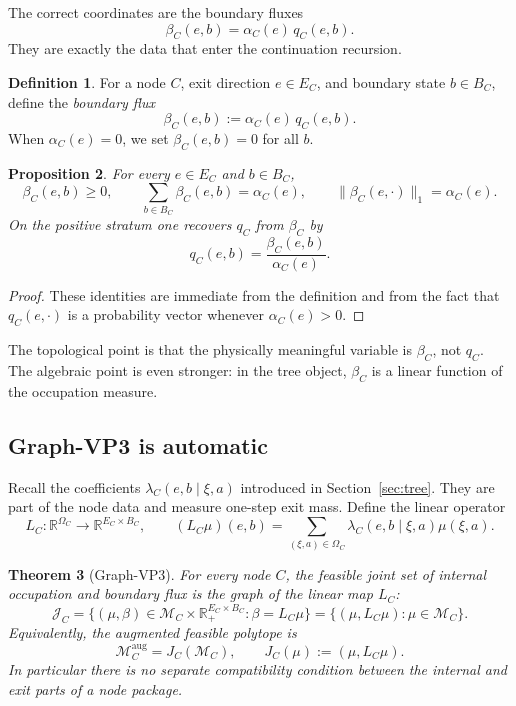 \documentclass[12pt]{article}
\newtheorem{theorem}{Theorem}[section]
\newtheorem{proposition}[theorem]{Proposition}
\theoremstyle{definition}
\newtheorem{definition}[theorem]{Definition}
\newcommand{\R}{\mathbb{R}}
\newcommand{\1}{\mathbf{1}}
\newcommand{\cM}{\mathcal{M}}
\begin{document}
The correct coordinates are the boundary fluxes
\[
\beta_C(e,b)=\alpha_C(e)\,q_C(e,b).
\]
They are exactly the data that enter the continuation recursion.

\begin{definition}
\label{def:beta}
For a node \(C\), exit direction \(e\in E_C\), and boundary state \(b\in B_C\), define
the \emph{boundary flux}
\[
\beta_C(e,b):=\alpha_C(e)\,q_C(e,b).
\]
When \(\alpha_C(e)=0\), we set \(\beta_C(e,b)=0\) for all \(b\).
\end{definition}

\begin{proposition}
\label{prop:beta-basic}
For every \(e\in E_C\) and \(b\in B_C\),
\[
\beta_C(e,b)\ge 0,\qquad
\sum_{b\in B_C}\beta_C(e,b)=\alpha_C(e),
\qquad
\|\beta_C(e,\cdot)\|_1=\alpha_C(e).
\]
On the positive stratum one recovers \(q_C\) from \(\beta_C\) by
\[
q_C(e,b)=\frac{\beta_C(e,b)}{\alpha_C(e)}.
\]
\end{proposition}

\begin{proof}
These identities are immediate from the definition and from the fact that
\(q_C(e,\cdot)\) is a probability vector whenever \(\alpha_C(e)>0\).
\end{proof}

The topological point is that the physically meaningful variable is \(\beta_C\), not
\(q_C\).  The algebraic point is even stronger: in the tree object, \(\beta_C\) is a
linear function of the occupation measure.

\subsection{Graph-VP3 is automatic}

Recall the coefficients \(\lambda_C(e,b\mid \xi,a)\) introduced in
Section~\ref{sec:tree}.  They are part of the node data and measure one-step exit mass.
Define the linear operator
\begin{equation}
\label{eq:LC}
L_C:\R^{\Omega_C}\to \R^{E_C\times B_C},
\qquad
(L_C\mu)(e,b)
=
\sum_{(\xi,a)\in\Omega_C}\lambda_C(e,b\mid \xi,a)\mu(\xi,a).
\end{equation}

\begin{theorem}[Graph-VP3]
\label{thm:graphVP3}
For every node \(C\), the feasible joint set of internal occupation and boundary flux is
the graph of the linear map \(L_C\):
\[
\mathcal J_C
=
\bigl\{
(\mu,\beta)\in \cM_C\times \R_+^{E_C\times B_C}:\beta=L_C\mu
\bigr\}
=
\{(\mu,L_C\mu):\mu\in \cM_C\}.
\]
Equivalently, the augmented feasible polytope is
\[
\cM_C^{\mathrm{aug}}=J_C(\cM_C),
\qquad
J_C(\mu):=(\mu,L_C\mu).
\]
In particular there is no separate compatibility condition between the internal and exit
parts of a node package.
\end{theorem}
\end{document}
